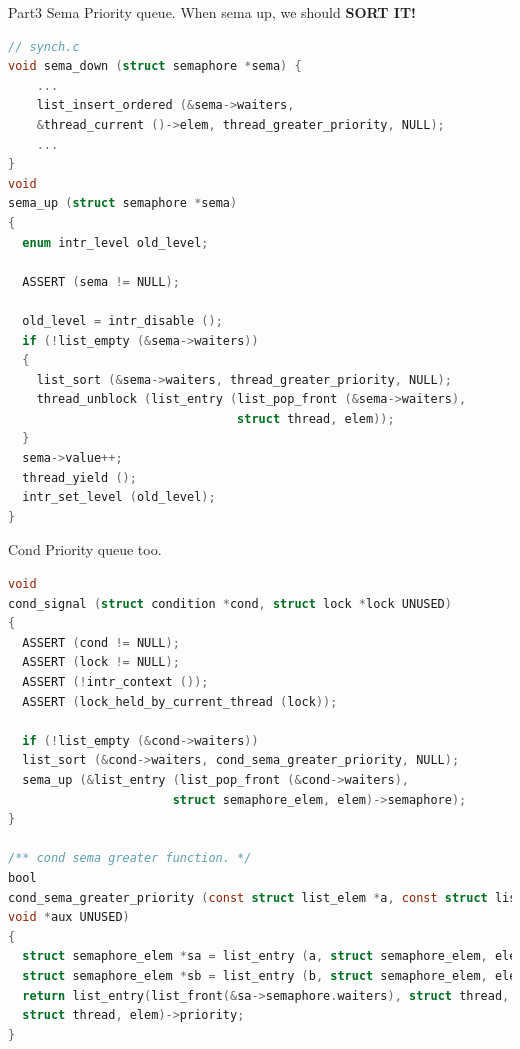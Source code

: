 \documentclass{beamer}
\begin{document}
\begin{frame}[fragile]{Part3 Sema}
Priority queue. When sema up, we should \textbf{SORT IT!}
\begin{lstlisting}[language=C]
// synch.c
void sema_down (struct semaphore *sema) {
    ...
    list_insert_ordered (&sema->waiters, 
    &thread_current ()->elem, thread_greater_priority, NULL);
    ...
}
void
sema_up (struct semaphore *sema) 
{
  enum intr_level old_level;

  ASSERT (sema != NULL);

  old_level = intr_disable ();
  if (!list_empty (&sema->waiters)) 
  {
    list_sort (&sema->waiters, thread_greater_priority, NULL);
    thread_unblock (list_entry (list_pop_front (&sema->waiters),
                                struct thread, elem));
  }
  sema->value++;
  thread_yield ();
  intr_set_level (old_level);
}
\end{lstlisting}
\end{frame}
\begin{frame}[fragile]{Cond}
Priority queue too.
\begin{lstlisting}[language=C]
void
cond_signal (struct condition *cond, struct lock *lock UNUSED) 
{
  ASSERT (cond != NULL);
  ASSERT (lock != NULL);
  ASSERT (!intr_context ());
  ASSERT (lock_held_by_current_thread (lock));

  if (!list_empty (&cond->waiters)) 
  list_sort (&cond->waiters, cond_sema_greater_priority, NULL);
  sema_up (&list_entry (list_pop_front (&cond->waiters),
                       struct semaphore_elem, elem)->semaphore);
}

/** cond sema greater function. */
bool 
cond_sema_greater_priority (const struct list_elem *a, const struct list_elem *b, 
void *aux UNUSED)
{
  struct semaphore_elem *sa = list_entry (a, struct semaphore_elem, elem);
  struct semaphore_elem *sb = list_entry (b, struct semaphore_elem, elem);
  return list_entry(list_front(&sa->semaphore.waiters), struct thread, elem)->priority > list_entry(list_front(&sb->semaphore.waiters),
  struct thread, elem)->priority;
}
\end{lstlisting}
\end{frame}
\end{document}
